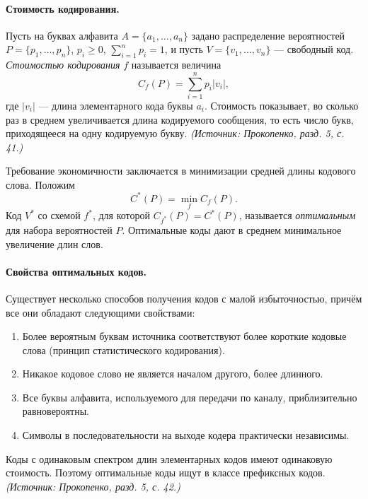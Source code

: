 \documentclass[a4paper,12pt]{article}
\begin{document}
\paragraph{Стоимость кодирования.}
Пусть на буквах алфавита \(A=\{a_1,\dots,a_n\}\) задано распределение вероятностей \(P=\{p_1,\dots,p_n\}\), \(p_i\ge 0\), \(\sum_{i=1}^n p_i=1\), и пусть \(V=\{v_1,\dots,v_n\}\) — свободный код. \emph{Стоимостью кодирования} \(f\) называется величина
\[
C_f(P)=\sum_{i=1}^n p_i |v_i|,
\]
где \(|v_i|\) — длина элементарного кода буквы \(a_i\). Стоимость показывает, во сколько раз в среднем увеличивается длина кодируемого сообщения, то есть число букв, приходящееся на одну кодируемую букву.
\textit{(Источник: Прокопенко, разд. 5, с. 41.)}

Требование экономичности заключается в минимизации средней длины кодового слова. Положим
\[
C^*(P)=\min_f C_f(P).
\]
Код \(V^*\) со схемой \(f^*\), для которой \(C_{f^*}(P)=C^*(P)\), называется \emph{оптимальным} для набора вероятностей \(P\). Оптимальные коды дают в среднем минимальное увеличение длин слов.

\paragraph{Свойства оптимальных кодов.}
Существует несколько способов получения кодов с малой избыточностью, причём все они обладают следующими свойствами:
\begin{enumerate}[label=\arabic*)]
\item Более вероятным буквам источника соответствуют более короткие кодовые слова (принцип статистического кодирования).
\item Никакое кодовое слово не является началом другого, более длинного.
\item Все буквы алфавита, используемого для передачи по каналу, приблизительно равновероятны.
\item Символы в последовательности на выходе кодера практически независимы.
\end{enumerate}
Коды с одинаковым спектром длин элементарных кодов имеют одинаковую стоимость. Поэтому оптимальные коды ищут в классе префиксных кодов.
\textit{(Источник: Прокопенко, разд. 5, с. 42.)}
\end{document}
